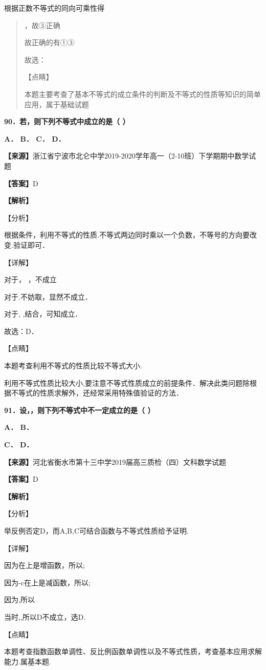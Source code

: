 根据正数不等式的同向可乘性得

\begin{quote}
，故③正确

故正确的有①③

故选：

【点睛】

本题主要考查了基本不等式的成立条件的判断及不等式的性质等知识的简单应用，属于基础试题
\end{quote}

\textbf{90．若，则下列不等式中成立的是（ ）}

\textbf{A． B． C． D．}

\textbf{【来源】}浙江省宁波市北仑中学2019-2020学年高一（2-10班）下学期期中数学试题

\textbf{【答案】}D

\textbf{【解析】}

【分析】

根据条件，利用不等式的性质.不等式两边同时乘以一个负数，不等号的方向要改变.验证即可．

【详解】

对于， ，不成立

对于.不妨取，显然不成立．

对于, ,结合，可知成立．

故选：D．

【点睛】

本题考查利用不等式的性质比较不等式大小.

利用不等式性质比较大小,要注意不等式性质成立的前提条件．解决此类问题除根据不等式的性质求解外，还经常采用特殊值验证的方法．

\textbf{91．设，，则下列不等式中不一定成立的是（ ）}

\textbf{A． B．}

\textbf{C． D．}

\textbf{【来源】}河北省衡水市第十三中学2019届高三质检（四）文科数学试题

\textbf{【答案】}D

\textbf{【解析】}

【分析】

举反例否定D，而A,B,C可结合函数与不等式性质给予证明.

【详解】

因为在上是增函数，所以;

因为-c在上是减函数，所以;

因为,所以

当时,,所以D不成立，选D.

【点睛】

本题考查指数函数单调性、反比例函数单调性以及不等式性质，考查基本应用求解能力.属基本题.

